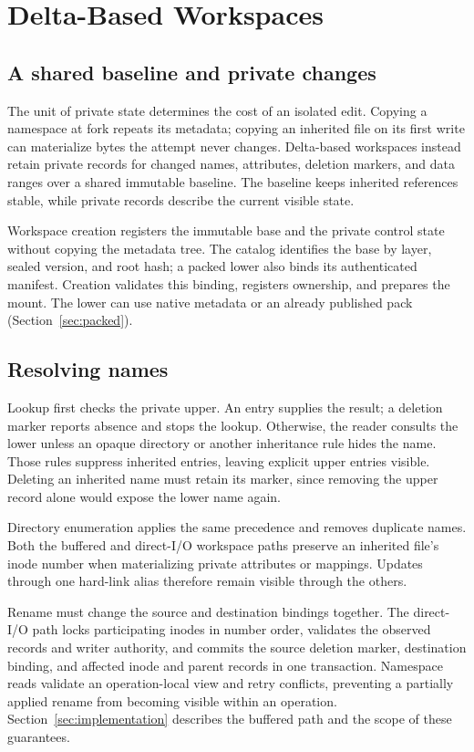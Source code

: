 \section{Delta-Based Workspaces}
\label{sec:delta}

\subsection{A shared baseline and private changes}

The unit of private state determines the cost of an isolated edit.
Copying a namespace at fork repeats its metadata; copying an inherited
file on its first write can materialize bytes the attempt never changes.
Delta-based workspaces instead retain private records for changed names,
attributes, deletion markers, and data ranges over a shared immutable
baseline. The baseline keeps inherited references stable, while private
records describe the current visible state.

Workspace creation registers the immutable base and the private control
state without copying the metadata tree. The catalog identifies the base
by layer, sealed version, and root hash; a packed lower also binds its
authenticated manifest. Creation validates this binding, registers
ownership, and prepares the mount. The lower can use native
metadata or an already published pack (Section~\ref{sec:packed}).

\subsection{Resolving names}

Lookup first checks the private upper. An entry supplies the result;
a deletion marker reports absence and stops the lookup. Otherwise, the
reader consults the lower unless an opaque directory or another
inheritance rule hides the name. Those rules suppress inherited entries,
leaving explicit upper entries visible. Deleting an inherited name must
retain its marker, since removing the upper record alone would expose
the lower name again.

Directory enumeration applies the same precedence and removes duplicate
names. Both the buffered and direct-I/O workspace paths preserve an
inherited file's inode number when materializing private attributes or
mappings. Updates through one hard-link alias therefore remain visible
through the others.

Rename must change the source and destination bindings together.
The direct-I/O path locks participating inodes in number order, validates
the observed records and writer authority, and commits the source
deletion marker, destination binding, and affected inode and parent
records in one transaction. Namespace reads validate an operation-local
view and retry conflicts, preventing a partially applied rename from
becoming visible within an operation. Section~\ref{sec:implementation}
describes the buffered path and the scope of these guarantees.

